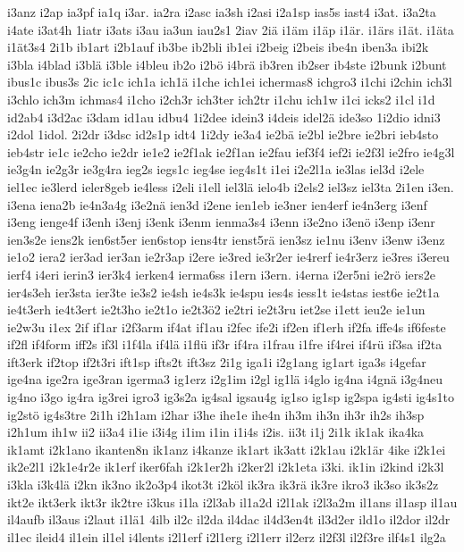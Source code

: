 {i3anz
i2ap
ia3pf
ia1q
i3ar.
ia2ra
i2asc
ia3sh
i2asi
i2a1sp
ias5s
iast4
i3at.
i3a2ta
i4ate
i3at4h
1iatr
i3ats
i3au
ia3un
iau2s1
2iav
2iä
i1äm
i1äp
i1är.
i1ärs
i1ät.
i1äta
i1ät3s4
2i1b
ib1art
i2b1auf
ib3be
ib2bli
ib1ei
i2beig
i2beis
ibe4n
iben3a
ibi2k
i3bla
i4blad
i3blä
i3ble
i4bleu
ib2o
i2bö
i4brä
ib3ren
ib2ser
ib4ste
i2bunk
i2bunt
ibus1c
ibus3s
2ic
ic1c
ich1a
ich1ä
i1che
ich1ei
ichermas8
ichgro3
i1chi
i2chin
ich3l
i3chlo
ich3m
ichmas4
i1cho
i2ch3r
ich3ter
ich2tr
i1chu
ich1w
i1ci
icks2
i1cl
i1d
id2ab4
i3d2ac
i3dam
id1au
idbu4
1i2dee
idein3
i4deis
idel2ä
ide3so
1i2dio
idni3
i2dol
1idol.
2i2dr
i3dsc
id2s1p
idt4
1i2dy
ie3a4
ie2bä
ie2bl
ie2bre
ie2bri
ieb4sto
ieb4str
ie1c
ie2cho
ie2dr
ie1e2
ie2f1ak
ie2f1an
ie2fau
ief3f4
ief2i
ie2f3l
ie2fro
ie4g3l
ie3g4n
ie2g3r
ie3g4ra
ieg2s
iegs1c
ieg4se
ieg4s1t
i1ei
i2e2l1a
ie3las
iel3d
i2ele
iel1ec
ie3lerd
ieler8geb
ie4less
i2eli
i1ell
iel3lä
ielo4b
i2els2
iel3sz
iel3ta
2i1en
i3en.
i3ena
iena2b
ie4n3a4g
i3e2nä
ien3d
i2ene
ien1eb
ie3ner
ien4erf
ie4n3erg
i3enf
i3eng
ienge4f
i3enh
i3enj
i3enk
i3enm
ienma3s4
i3enn
i3e2no
i3enö
i3enp
i3enr
ien3s2e
iens2k
ien6st5er
ien6stop
iens4tr
ienst5rä
ien3sz
ie1nu
i3env
i3enw
i3enz
ie1o2
iera2
ier3ad
ier3an
ie2r3ap
i2ere
ie3red
ie3r2er
ie4rerf
ie4r3erz
ie3res
i3ereu
ierf4
i4eri
ierin3
ier3k4
ierken4
ierma6ss
i1ern
i3ern.
i4erna
i2er5ni
ie2rö
iers2e
ier4s3eh
ier3sta
ier3te
ie3s2
ie4sh
ie4s3k
ie4spu
ies4s
iess1t
ie4stas
iest6e
ie2t1a
ie4t3erh
ie4t3ert
ie2t3ho
ie2t1o
ie2t3ö2
ie2tri
ie2t3ru
iet2se
i1ett
ieu2e
ie1un
ie2w3u
i1ex
2if
if1ar
i2f3arm
if4at
if1au
i2fec
ife2i
if2en
if1erh
if2fa
iffe4s
if6feste
if2fl
if4form
iff2s
if3l
i1f4la
if4lä
i1flü
if3r
if4ra
i1frau
i1fre
if4rei
if4rü
if3sa
if2ta
ift3erk
if2top
if2t3ri
ift1sp
ifts2t
ift3sz
2i1g
iga1i
i2g1ang
ig1art
iga3s
i4gefar
ige4na
ige2ra
ige3ran
igerma3
ig1erz
i2g1im
i2gl
ig1lä
i4glo
ig4na
i4gnä
i3g4neu
ig4no
i3go
ig4ra
ig3rei
igro3
ig3s2a
ig4sal
igsau4g
ig1so
ig1sp
ig2spa
ig4sti
ig4s1to
ig2stö
ig4s3tre
2i1h
i2h1am
i2har
i3he
ihe1e
ihe4n
ih3m
ih3n
ih3r
ih2s
ih3sp
i2h1um
ih1w
ii2
ii3a4
i1ie
i3i4g
i1im
i1in
i1i4s
i2is.
ii3t
i1j
2i1k
ik1ak
ika4ka
ik1amt
i2k1ano
ikanten8n
ik1anz
i4kanze
ik1art
ik3att
i2k1au
i2k1är
4ike
i2k1ei
ik2e2l1
i2k1e4r2e
ik1erf
iker6fah
i2k1er2h
i2ker2l
i2k1eta
i3ki.
ik1in
i2kind
i2k3l
i3kla
i3k4lä
i2kn
ik3no
ik2o3p4
ikot3t
i2köl
ik3ra
ik3rä
ik3re
ikro3
ik3so
ik3s2z
ikt2e
ikt3erk
ikt3r
ik2tre
i3kus
i1la
i2l3ab
il1a2d
i2l1ak
i2l3a2m
il1ans
il1asp
il1au
il4aufb
il3aus
i2laut
i1lä1
4ilb
il2c
il2da
il4dac
il4d3en4t
il3d2er
ild1o
il2dor
il2dr
il1ec
ileid4
il1ein
il1el
i4lents
i2l1erf
i2l1erg
i2l1err
il2erz
il2f3l
il2f3re
ilf4s1
ilg2a
}
